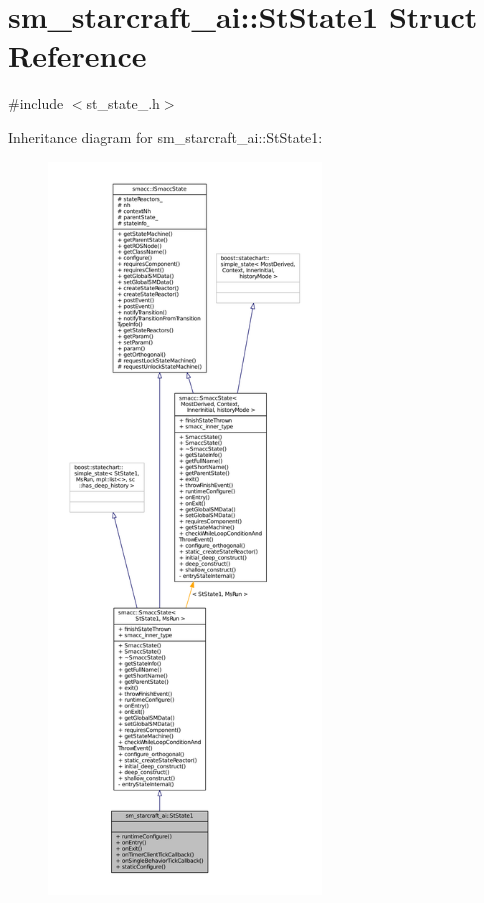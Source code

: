 \hypertarget{structsm__starcraft__ai_1_1StState1}{}\section{sm\+\_\+starcraft\+\_\+ai\+:\+:St\+State1 Struct Reference}
\label{structsm__starcraft__ai_1_1StState1}


{\ttfamily \#include $<$st\+\_\+state\+\_.\+h$>$}



Inheritance diagram for sm\+\_\+starcraft\+\_\+ai\+:\+:St\+State1\+:
\nopagebreak
\begin{figure}[H]
\begin{center}
\leavevmode
\includegraphics[height=550pt]{structsm__starcraft__ai_1_1StState1__inherit__graph}
\end{center}
\end{figure}


